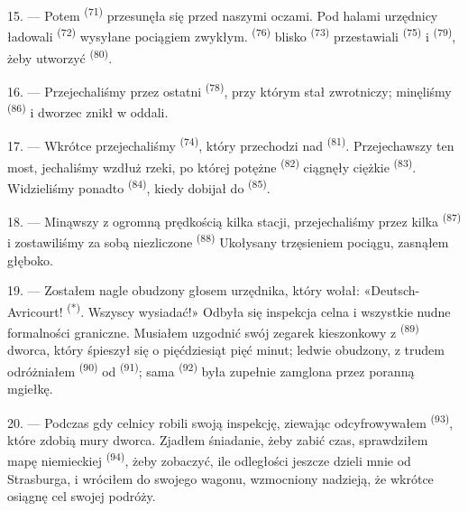 15. --- Potem  \textsuperscript{(71)} przesunęła się przed
naszymi oczami. Pod halami urzędnicy ładowali  \textsuperscript{(72)}
wysyłane pociągiem zwykłym.  \textsuperscript{(76)} blisko
 \textsuperscript{(73)} przestawiali 
\textsuperscript{(75)} i  \textsuperscript{(79)}, żeby utworzyć
 \textsuperscript{(80)}.

16. --- Przejechaliśmy przez ostatni  \textsuperscript{(78)}, przy
którym stał zwrotniczy; minęliśmy  \textsuperscript{(86)} i
dworzec znikł w oddali.

17. --- Wkrótce przejechaliśmy  \textsuperscript{(74)}, który
przechodzi nad  \textsuperscript{(81)}. Przejechawszy ten most,
jechaliśmy wzdłuż rzeki, po której potężne  \textsuperscript{(82)}
ciągnęły ciężkie  \textsuperscript{(83)}. Widzieliśmy ponadto
 \textsuperscript{(84)}, kiedy dobijał do 
\textsuperscript{(85)}.

18. --- Minąwszy z ogromną prędkością kilka stacji, przejechaliśmy przez kilka
 \textsuperscript{(87)} i zostawiliśmy za sobą niezliczone
 \textsuperscript{(88)}  Ukołysany trzęsieniem
pociągu, zasnąłem głęboko.

\VUsaut{3.0mm}
\VUsaut{3.0mm}

19. --- Zostałem nagle obudzony głosem urzędnika, który wołał: «Deutsch-Avricourt!
\textsuperscript{(*)}. Wszyscy wysiadać!» Odbyła się inspekcja celna i wszystkie nudne
formalności graniczne. Musiałem uzgodnić swój zegarek kieszonkowy z  \textsuperscript{(89)} dworca, który śpieszył się o pięćdziesiąt pięć minut;
ledwie obudzony, z trudem odróżniałem  \textsuperscript{(90)}
od  \textsuperscript{(91)}; sama  \textsuperscript{(92)}
była zupełnie zamglona przez poranną mgiełkę.

20. --- Podczas gdy celnicy robili swoją inspekcję, ziewając odcyfrowywałem
 \textsuperscript{(93)}, które zdobią mury dworca. Zjadłem śniadanie, żeby
zabić czas, sprawdziłem mapę niemieckiej  \textsuperscript{(94)}, żeby
zobaczyć, ile odległości jeszcze dzieli mnie od Strasburga, i wróciłem do swojego
wagonu, wzmocniony nadzieją, że wkrótce osiągnę cel swojej podróży.
\VUsaut{6.0mm}
\VUfilet{22mm}
